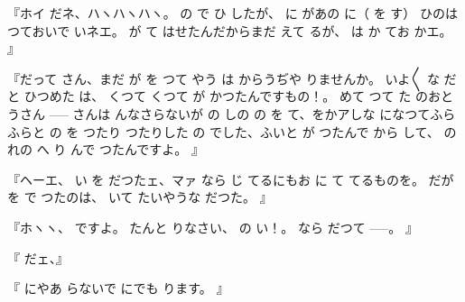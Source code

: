 『ホイ
だネ、ハヽハヽハヽ。
の
で
ひ
したが、
に
があの
に（
を
す）
ひのは
つておいで\ninojiten{}
いネエ。
が
て\ninojiten{}
はせたんだからまだ
えて
るが、
は
か
てお
かエ。
』

『だって
さん、まだ
が
を
つて
やう
は
からうぢや
りませんか。
いよ〳〵
な
だと
ひつめた
は、
くつて
くつて
が
かつたんですもの！。
めて
つて
た
のおとうさん \------
さんは
んなさらないが
の
しの
の
を
て、をかアしな
になつてふらふらと
の
を
つたり
つたりした
の
でした、ふいと
が
つたんで
から
して、
の
れの
へ
り
んで
つたんですよ。
』

『ヘーエ、
い
を
だつたェ、マァ
なら
じ
てるにもお
に
て
てるものを。
だが
を
で
つたのは、
いて
たいやうな
だつた。
』

『ホヽヽ、
ですよ。
たんと
りなさい、
の
い！。
なら
だつて \------。
』

『
だェ、』

『
にやあ
らないで
にでも
ります。
』

